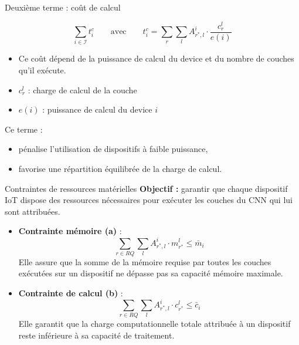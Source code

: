 \documentclass[aspectratio=169]{beamer}
\begin{document}
\begin{frame}{Deuxième terme : coût de calcul}

\[
\sum_{i \in \mathcal{I}} t_i^c
\qquad \text{avec} \qquad
t_i^c =
\sum_{r}
\sum_{l}
A^{i}_{r^*,l} \cdot \frac{c^l_r}{e(i)}
\]

\medskip
\begin{itemize}
  \item Ce coût dépend de la puissance de calcul du device et du nombre de couches qu’il exécute.
  \item $c^l_r$ : charge de calcul de la couche
  \item $e(i)$ : puissance de calcul du device $i$
\end{itemize}

\medskip
Ce terme :
\begin{itemize}
  \item pénalise l’utilisation de dispositifs à faible puissance,
  \item favorise une répartition équilibrée de la charge de calcul.
\end{itemize}

\end{frame}

\begin{frame}{Contraintes de ressources matérielles}
\textbf{Objectif :} garantir que chaque dispositif IoT dispose des ressources nécessaires pour exécuter les couches du CNN qui lui sont attribuées.

\vspace{0.3cm}
\begin{itemize}
    \item \textbf{Contrainte mémoire (a)} :
    \[
    \sum_{r \in RQ}\sum_{l}
    A^{i}_{r^*,l} \cdot m^{l}_{r^*}
    \le \bar{m}_i
    \]
    \small
    Elle assure que la somme de la mémoire requise par toutes les couches exécutées sur un dispositif ne dépasse pas sa capacité mémoire maximale.
    
    \vspace{0.2cm}
    \item \textbf{Contrainte de calcul (b)} :
    \[
    \sum_{r \in RQ}\sum_{l}
    A^{i}_{r^*,l} \cdot c^{l}_{r^*}
    \le \bar{c}_i
    \]
    \small
    Elle garantit que la charge computationnelle totale attribuée à un dispositif reste inférieure à sa capacité de traitement.
\end{itemize}
\end{frame}
\end{document}
